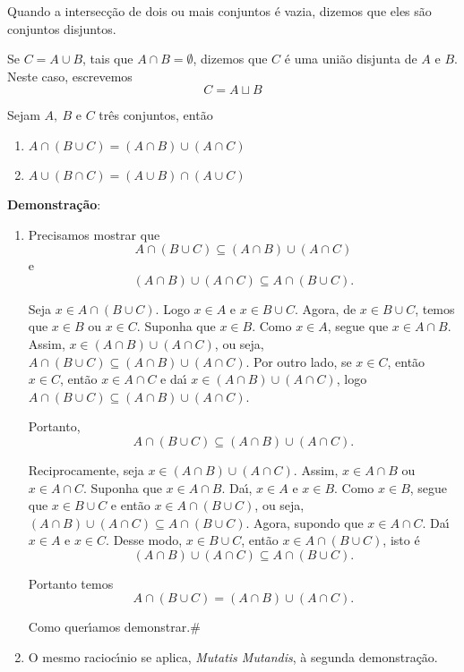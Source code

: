 Quando a intersec{\c c}{\~a}o de dois ou mais conjuntos {\'e} vazia, dizemos que eles s{\~a}o conjuntos disjuntos.

Se $C = A \cup B$, tais que $A \cap B = \emptyset$, dizemos que $C$ {\'e} uma uni{\~a}o disjunta de $A$ e $B$. Neste caso, escrevemos
\[C = A \sqcup B\]

\begin{proposicao} Sejam $A,\ B$ e $C$ tr{\^e}s conjuntos, ent{\~a}o
\begin{enumerate}
\item $A\cap(B\cup C)=(A\cap B)\cup(A\cap C)$
\item $A\cup(B\cap C)=(A\cup B)\cap(A\cup C)$
\end{enumerate}
\end{proposicao}

\textbf{Demonstra{\c c}{\~a}o}:
\begin{enumerate}
\item Precisamos mostrar que
\[A\cap(B\cup C)\subseteq(A\cap B)\cup(A\cap C)\]
e
\[(A\cap B)\cup(A\cap C)\subseteq A\cap(B\cup C).\]

Seja $x\in A\cap(B\cup C)$. Logo $x\in A$ e $x\in B\cup C$. Agora, de $x\in B\cup C$, temos que $x\in B$ ou $x\in C$. Suponha que $x\in B$. Como $x\in A$, segue que $x\in A\cap B$. Assim, $x\in(A\cap B)\cup(A\cap C)$, ou seja, $A\cap(B\cup C)\subseteq(A\cap B)\cup(A\cap C)$. Por outro lado, se $x\in C$, ent{\~a}o $x\in C$, ent{\~a}o $x\in A\cap C$ e da{\'\i} $x\in(A\cap B)\cup(A\cap C)$, logo $A\cap(B\cup C)\subseteq(A\cap B)\cup(A\cap C)$.

Portanto,
\[A\cap(B\cup C)\subseteq(A\cap B)\cup(A\cap C).\]

Reciprocamente, seja $x\in(A\cap B)\cup(A\cap C)$. Assim, $x\in A\cap B$ ou $x\in A\cap C$. Suponha que $x\in A\cap B$. Da{\'\i}, $x\in A$ e $x\in B$. Como $x\in B$, segue que $x\in B\cup C$ e ent{\~a}o $x\in A\cap(B\cup C)$, ou seja, $(A\cap B)\cup(A\cap C)\subseteq A\cap(B\cup C)$. Agora, supondo que $x\in A\cap C$. Da{\'\i} $x\in A$ e $x\in C$. Desse modo, $x\in B\cup C$, ent{\~a}o $x\in A\cap(B\cup C)$, isto {\'e}
\[(A\cap B)\cup(A\cap C)\subseteq A\cap(B\cup C).\]

Portanto temos \[A\cap(B\cup C)=(A\cap B)\cup(A\cap C).\]

Como quer{\'\i}amos demonstrar.\#
\item O mesmo racioc{\'\i}nio se aplica, \textit{Mutatis Mutandis}, {\`a} segunda demonstra{\c c}{\~a}o.
\end{enumerate}

